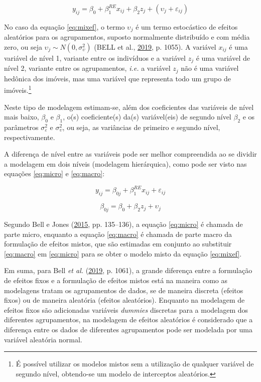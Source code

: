 \documentclass[
  a4paper, 11pt]{article}
\begin{document}
\begin{equation} \label{eq:mixef}
y_{ij} = \beta_0 + \beta_1^{RE} x_{ij} + \beta_2 z_j + (\upsilon_j + \varepsilon_{ij}) 
\end{equation}

No caso da equação \ref{eq:mixef}, o termo \(\upsilon_j\) é um termo
estocástico de efeitos aleatórios para os agrupamentos, suposto
normalmente distribuído e com média zero, ou seja
\(\upsilon_j \sim N(0, \sigma_{\upsilon}^2)\) (BELL et al.,
\protect\hyperlink{ref-bell2019}{2019}, p. 1055). A variável \(x_{ij}\)
é uma variável de nível 1, variante entre os indivíduos e a variável
\(z_j\) é uma variável de nível 2, variante entre os agrupamentos,
\emph{i.e.} a variável \(z_j\) não é uma variável hedônica dos imóveis,
mas uma variável que representa todo um grupo de imóveis.\footnote{É
  possível utilizar os modelos mistos sem a utilização de qualquer
  variável de segundo nível, obtendo-se um modelo de interceptos
  aleatórios.}

Neste tipo de modelagem estimam-se, além dos coeficientes das variáveis
de nível mais baixo, \(\beta_0\) e \(\beta_1\), o(s) coeficiente(s)
da(s) variável(eis) de segundo nível \(\beta_2\) e os parâmetros
\(\sigma_\varepsilon^2\) e \(\sigma_\upsilon^2\), ou seja, as variâncias
de primeiro e segundo nível, respectivamente.

A diferença de nível entre as variáveis pode ser melhor compreendida ao
se dividir a modelagem em dois níveis (modelagem hierárquica), como pode
ser visto nas equações \ref{eq:micro} e \ref{eq:macro}:

\begin{equation} \label{eq:micro}
y_{ij} = \beta_{0j} + \beta_1^{RE} x_{ij} + \varepsilon_{ij} 
\end{equation}

\begin{equation} \label{eq:macro}
\beta_{0j} = \beta_0 + \beta_2 z_{j} + \upsilon_{j} 
\end{equation}

Segundo Bell e Jones (\protect\hyperlink{ref-bell2015}{2015}, pp.
135--136), a equação \ref{eq:micro} é chamada de parte micro, enquanto a
equação \ref{eq:macro} é chamada de parte macro da formulação de efeitos
mistos, que são estimadas em conjunto ao substituir \ref{eq:macro} em
\ref{eq:micro} para se obter o modelo misto da equação \ref{eq:mixef}.

Em suma, para Bell \emph{et al.}
(\protect\hyperlink{ref-bell2019}{2019}, p. 1061), a grande diferença
entre a formulação de efeitos fixos e a formulação de efeitos mistos
está na maneira como as modelagens tratam os agrupamentos de dados, se
de maneira discreta (efeitos fixos) ou de maneira aleatória (efeitos
aleatórios). Enquanto na modelagem de efeitos fixos são adicionadas
variáveis \emph{dummies} discretas para a modelagem dos diferentes
agrupamentos, na modelagem de efeitos aleatórios é considerado que a
diferença entre os dados de diferentes agrupamentos pode ser modelada
por uma variável aleatória normal.
\end{document}
